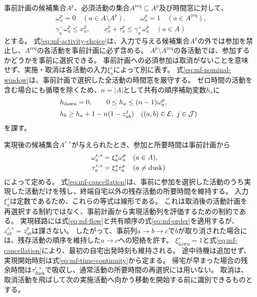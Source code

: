 事前計画の候補集合$A^p$、必須活動の集合$A^{\mathrm{req}}\subseteq A^p$及び時間窓に対して、
\begin{align}
 &\omega_a^p=0\quad(a\in A\setminus A^p),\qquad
 \omega_a^p=1\quad(a\in A^{\mathrm{req}}),
 \label{eq:mf-activity-choice}\\
 &\gamma_a^-\omega_a^p\le x_a^p,\qquad
 x_a^p+\tau_a^p\le\gamma_a^+\omega_a^p
 \quad(a\in A)
 \label{eq:mf-nominal-window}
\end{align}
とする。
式\eqref{eq:mf-activity-choice}は、入力で与える候補集合$A^p$の外では参加を禁止し、$A^{\mathrm{req}}$の各活動を事前計画に必ず含める。
$A^p\setminus A^{\mathrm{req}}$の各活動では、参加するかどうかを事前に選択できる。
事前計画への必須参加は取消がないことを意味せず、実施・取消は各活動の入力$\xi_a^s$によって別に表す。
式\eqref{eq:mf-nominal-window}は、事前計画で選択した全活動の時間窓を厳守する。
ゼロ時間の活動を含む場合にも循環を除くため、$n=|A|$として共有の順序補助変数$h_a$に
\begin{align}
 &h_{\mathrm{dawn}}=0,\qquad
 0\le h_a\le(n-1)\omega_a^p,
 \notag\\
 &h_b\ge h_a+1-n(1-z_{ab}^j)
 \quad((a,b)\in\mathcal E,\ j\in\mathcal J)
 \label{eq:mf-order}
\end{align}
を課す。

実現後の候補集合$A^{r,s}$が与えられたとき、参加と所要時間は事前計画から
\begin{align}
 \omega_a^{r,s}&=\xi_a^s\omega_a^p
 &&(a\in A),\notag\\
 \tau_a^{r,s}&=\xi_a^s\tau_a^p
 &&(a\ne\mathrm{dusk})
 \label{eq:mf-cancellation}
\end{align}
によって定める。
式\eqref{eq:mf-cancellation}は、事前に参加を選択した活動のうち実現した活動だけを残し、終端自宅以外の残存活動の所要時間を維持する。
入力$\xi_a^s$は定数であるため、これらの等式は線形である。
これは取消後の活動計画を再選択する制約ではなく、事前計画から実現活動列を評価するための制約である。
実現経路には式\eqref{eq:mf-flow}と共有順序の式\eqref{eq:mf-order}を適用するが、$z_{ab}^{r,s}=z_{ab}^p$は課さない。
したがって、事前列$a\to b\to c$で$b$が取り消された場合には、残存活動の順序を維持した$a\to c$への短絡を許す。
$\xi_{\mathrm{dawn}}^s=1$と式\eqref{eq:mf-cancellation}により、最初の自宅出発時刻も維持される。
途中待機は追加せず、実現開始時刻は式\eqref{eq:mf-time-continuity}から定まる。
帰宅が早まった場合の残余時間は$\tau_{\mathrm{dusk}}^{r,s}$で吸収し、通常活動の所要時間の再選択には用いない。
取消は、取消活動を飛ばして次の実施活動へ向かう移動を開始する前に識別できるものとする。

